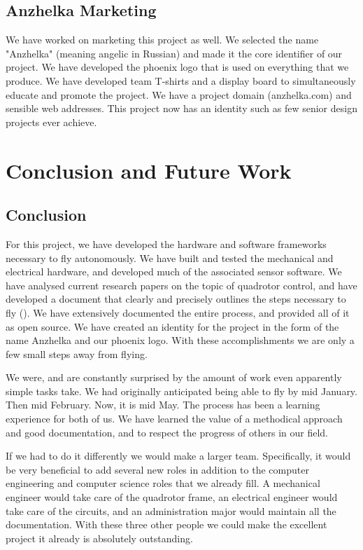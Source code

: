 \documentclass{article}
\numberwithin{equation}{section} %
\begin{document}
\subsection{Anzhelka Marketing}
We have worked on marketing this project as well. We selected the name "Anzhelka" (meaning angelic in Russian) and made it the core identifier of our project. We have developed the phoenix logo that is used on everything that we produce. We have developed team T-shirts and a display board to simultaneously educate and promote the project. We have a project domain (anzhelka.com) and sensible web addresses. This project now has an identity such as few senior design projects ever achieve.



\section{Conclusion and Future Work}

\subsection{Conclusion}
For this project, we have developed the hardware and software frameworks necessary to fly autonomously. We have built and tested the mechanical and electrical hardware, and developed much of the associated sensor software. We have analysed current research papers on the topic of quadrotor control, and have developed a document that clearly and precisely outlines the steps necessary to fly (\cite{anzhelka_math}). We have extensively documented the entire process, and provided all of it as open source. We have created an identity for the project in the form of the name Anzhelka and our phoenix logo. With these accomplishments we are only a few small steps away from flying.

We were, and are constantly surprised by the amount of work even apparently simple tasks take. We had originally anticipated being able to fly by mid January. Then mid February. Now, it is mid May. The process has been a learning experience for both of us. We have learned the value of a methodical approach and good documentation, and to respect the progress of others in our field.

If we had to do it differently we would make a larger team. Specifically, it would be very beneficial to add several new roles in addition to the computer engineering and computer science roles that we already fill. A mechanical engineer would take care of the quadrotor frame, an electrical engineer would take care of the circuits, and an administration major would maintain all the documentation. With these three other people we could make the excellent project it already is absolutely outstanding.
\end{document}
